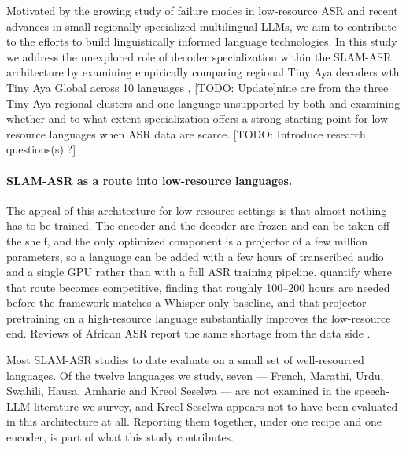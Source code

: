 \documentclass[11pt]{article}
\begin{document}
Motivated by the growing study of failure modes in low-resource ASR and recent advances in small regionally specialized multilingual LLMs, we aim to contribute to the efforts to build linguistically informed language technologies. In this study we address the unexplored role of decoder specialization within the SLAM-ASR architecture by examining empirically comparing regional Tiny Aya decoders wth Tiny Aya Global across 10 languages , [TODO: Update]nine  are from the three Tiny Aya regional clusters and one language unsupported by both and %
examining whether and to what extent specialization offers a strong starting point for low-resource languages when ASR data are scarce. [TODO: Introduce research questions(s) ?]



\paragraph{SLAM-ASR as a route into low-resource languages.}
The appeal of this architecture for low-resource settings is that almost nothing has to be
trained. The encoder and the decoder are frozen and can be taken off the shelf, and the only
optimized component is a projector of a few million parameters, so a language can be added with
a few hours of transcribed audio and a single GPU rather than with a full ASR training pipeline.
\citet{fongSpeechLLMsLowResource2025} quantify where that route becomes competitive, finding
that roughly 100--200 hours are needed before the framework matches a Whisper-only baseline, and
that projector pretraining on a high-resource language substantially improves the low-resource
end. Reviews of African ASR report the same shortage from the data side
\citep{imamAutomaticSpeechRecognitionAfrican2025, adjoviSpeechTextCorpora2026}.

Most SLAM-ASR studies to date evaluate on a small set of well-resourced languages. Of the twelve
languages we study, seven --- French, Marathi, Urdu, Swahili, Hausa, Amharic and Kreol Seselwa
--- are not examined in the speech-LLM literature we survey, and Kreol Seselwa appears not to
have been evaluated in this architecture at all. Reporting them together, under one recipe and
one encoder, is part of what this study contributes.
\end{document}
